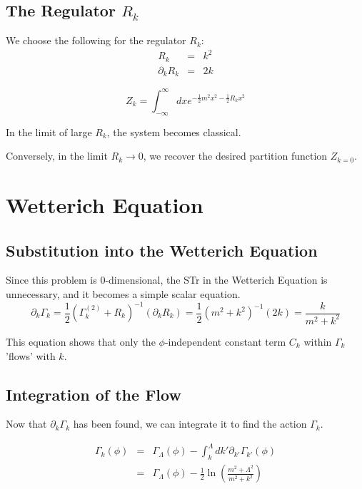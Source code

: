 \documentclass[uplatex,a4j,12pt,dvipdfmx]{jsarticle}
\begin{document}
\subsection{The Regulator $R_{k}$}

We choose the following for the regulator $R_k$:
\[
	\begin{array}{rcl}
		R_{k}              & = & k^{2} \\
		\partial_{k} R_{k} & = & 2 k
	\end{array}
\]

\[
	Z_{k} =
	\int^{\infty}_{- \infty} dx e^{ -\frac{1}{2} m^{2} x^{2} - \frac{1}{2} R_{k} x^{2} }
\]

In the limit of large $R_{k}$, the system becomes classical.

Conversely, in the limit $R_{k} \to 0$, we recover the desired partition function $Z_{k=0}$.

\section{Wetterich Equation}

\subsection{Substitution into the Wetterich Equation}

Since this problem is 0-dimensional, the STr in the Wetterich Equation is unnecessary,
and it becomes a simple scalar equation.
\[
	\partial_k \Gamma_k = \frac{1}{2} ( \Gamma_k^{(2)} + R_k )^{-1} (\partial_k R_k)
	= \frac{1}{2} ( m^2 + k^2 )^{-1} (2k)
	= \frac{k}{m^2+k^2}
\]

This equation shows that
only the $\phi$-independent constant term $C_k$ within $\Gamma_k$ 'flows' with $k$.

\subsection{Integration of the Flow}

Now that $\partial_k \Gamma_k$ has been found, we can integrate it to find the action $\Gamma_{k}$.

\[
	\begin{array}{rcl}
		\Gamma_{k}(\phi) & = & \displaystyle \Gamma_{\Lambda} (\phi) - \int^{\Lambda}_{k} dk' \partial_{k'} \Gamma_{k'}(\phi)                 \\
		                 & = & \displaystyle \Gamma_{\Lambda} (\phi) - \frac{1}{2} \ln \left( \frac{m^{2} + \Lambda^{2}}{m^{2}+k^{2}} \right)
	\end{array}
\]
\end{document}
